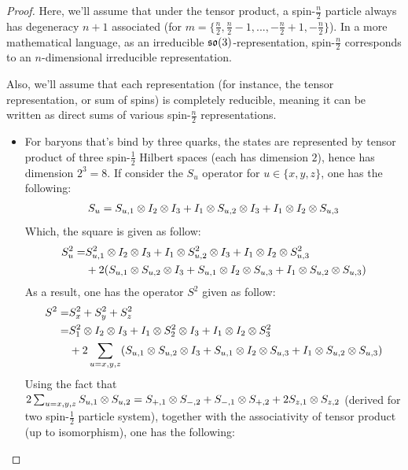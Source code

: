 \documentclass{article}
\begin{document}
\begin{proof}
    
    Here, we'll assume that under the tensor product, a spin-$\frac{n}{2}$ particle always has degeneracy $n+1$ associated (for $m=\{\frac{n}{2},\frac{n}{2}-1,...,-\frac{n}{2}+1, -\frac{n}{2}\}$). In a more mathematical language, as an irreducible $\mathfrak{so}(3)$-representation, spin-$\frac{n}{2}$ corresponds to an $n$-dimensional irreducible representation.

    Also, we'll assume that each representation (for instance, the tensor representation, or sum of spins) is completely reducible, meaning it can be written as direct sums of various spin-$\frac{n}{2}$ representations.

    \hfil

    \begin{itemize}
        \item[(a)] For baryons that's bind by three quarks, the states are represented by tensor product of three spin-$\frac{1}{2}$ Hilbert spaces (each has dimension $2$), hence has dimension $2^3 = 8$. If consider the $S_u$ operator for $u\in\{x,y,z\}$, one has the following:
        \begin{align}
            S_u = S_{u,1}\otimes I_2\otimes I_3+I_1\otimes S_{u,2}\otimes I_3 + I_1\otimes I_2\otimes S_{u,3}
        \end{align}
        Which, the square is given as follow:
        \begin{align}
            S_u^2 =& S_{u,1}^2\otimes I_2\otimes I_3+I_1\otimes S_{u,2}^2\otimes I_3+I_1\otimes I_2\otimes S_{u,3}^2\\ 
            &+ 2(S_{u,1}\otimes S_{u,2}\otimes I_3+S_{u,1}\otimes I_2\otimes S_{u,3}+I_1\otimes S_{u,2}\otimes S_{u,3})
        \end{align}
        As a result, one has the operator $S^2$ given as follow:
        \begin{align}
            S^2 =& S_x^2+S_y^2+S_z^2\\
            =& S_1^2 \otimes I_2\otimes I_3+I_1 \otimes S_2^2\otimes I_3+I_1\otimes I_2\otimes S_3^2\\
            &+ 2\sum_{u=x,y,z}(S_{u,1}\otimes S_{u,2}\otimes I_3+S_{u,1}\otimes I_2\otimes S_{u,3}+I_1\otimes S_{u,2}\otimes S_{u,3})
        \end{align}
        Using the fact that $2\sum_{u=x,y,z}S_{u,1}\otimes S_{u,2} = S_{+,1}\otimes S_{-,2}+S_{-,1}\otimes S_{+,2}+2S_{z,1}\otimes S_{z,2}$ (derived for two spin-$\frac{1}{2}$ particle system), together with the associativity of tensor product (up to isomorphism), one has the following:

\end{itemize}
\end{proof}
\end{document}
